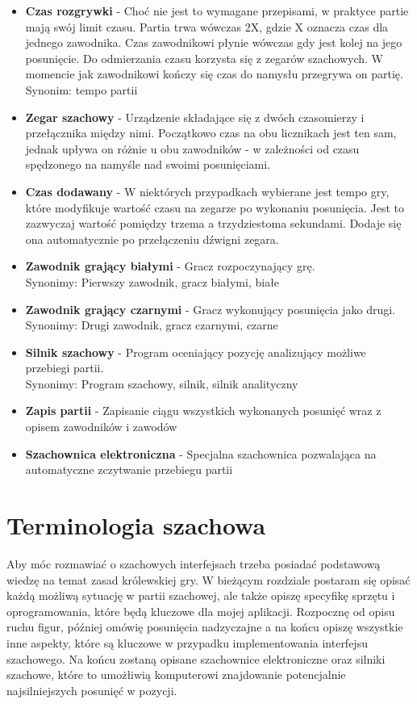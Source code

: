 \documentclass[12pt,leqno]{article}
\begin{document}
\begin{itemize}
\item{\bf Czas rozgrywki} - Choć nie jest to wymagane przepisami, w praktyce partie mają swój limit czasu. Partia trwa wówczas 2X, gdzie X oznacza czas dla jednego zawodnika. Czas zawodnikowi płynie wówczas gdy jest kolej na jego posunięcie. Do odmierzania czasu korzysta się z zegarów szachowych. W momencie jak zawodnikowi kończy się czas do namysłu przegrywa on partię. \\ Synonim: tempo partii
\item{\bf Zegar szachowy} - Urządzenie składające się z dwóch czasomierzy i przełącznika między nimi. Początkowo czas na obu licznikach jest ten sam, jednak upływa on różnie u obu zawodników - w zależności od czasu spędzonego na namyśle nad swoimi posunięciami. 
\item{\bf Czas dodawany} - W niektórych przypadkach wybierane jest tempo gry, które modyfikuje wartość czasu na zegarze po wykonaniu posunięcia. Jest to zazwyczaj wartość pomiędzy trzema a trzydziestoma sekundami. Dodaje się ona automatycznie po przełączeniu dźwigni zegara. 
\item {\bf Zawodnik grający białymi} - Gracz rozpoczynający grę. \\ Synonimy: Pierwszy zawodnik, gracz białymi, białe 
\item {\bf Zawodnik grający czarnymi} - Gracz wykonujący posunięcia jako drugi. \\Synonimy: Drugi zawodnik, gracz czarnymi, czarne
\item {\bf Silnik szachowy} - Program oceniający pozycję analizujący możliwe przebiegi partii. \\Synonimy: Program szachowy, silnik, silnik analityczny
\item {\bf Zapis partii} - Zapisanie ciągu wszystkich wykonanych posunięć wraz z opisem zawodników i zawodów
\item {\bf Szachownica elektroniczna} - Specjalna szachownica pozwalająca na automatyczne zczytwanie przebiegu partii


\end{itemize}

\section{Terminologia szachowa}
Aby móc rozmawiać o szachowych interfejsach trzeba posiadać podstawową wiedzę na temat zasad królewskiej gry. W bieżącym rozdziale postaram się opisać każdą możliwą sytuację w partii szachowej, ale także opiszę specyfikę sprzętu i oprogramowania, które będą kluczowe dla mojej aplikacji. Rozpocznę od opisu ruchu figur, później omówię posunięcia nadzyczajne a na końcu opiszę wszystkie inne aspekty, które są kluczowe w przypadku implementowania interfejsu szachowego. Na końcu zostaną opisane szachownice elektroniczne oraz silniki szachowe, które to umożłiwią komputerowi znajdowanie potencjalnie najsilniejszych posunięć w pozycji.
\end{document}
